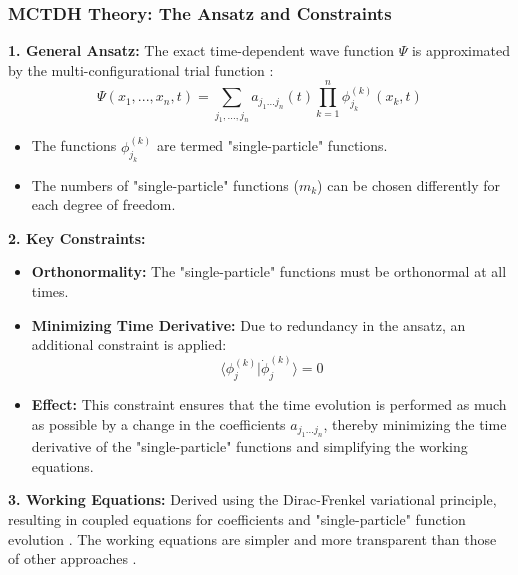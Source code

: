 \begin{frame}
    \frametitle{MCTDH Theory: The Ansatz and Constraints}
    
    \textbf{1. General Ansatz:}
    The exact time-dependent wave function $\Psi$ is approximated by the multi-configurational trial function :
    \begin{equation*}
        \Psi(x_1,...,x_n, t)= \sum_{j_1,...,j_n} a_{j_1...j_n} (t) \prod_{k=1}^n \phi_{j_k}^{(k)}(x_k, t)
    \end{equation*}
    \begin{itemize}
        \item The functions $\phi_{j_k}^{(k)}$ are termed "single-particle" functions.
        \item The numbers of "single-particle" functions ($m_k$) can be chosen differently for each degree of freedom.
    \end{itemize}
    
\end{frame}
\begin{frame}
    \textbf{2. Key Constraints:}
    \begin{itemize}
        \item \textbf{Orthonormality:} The "single-particle" functions must be orthonormal at all times.
        \item \textbf{Minimizing Time Derivative:} Due to redundancy in the ansatz, an additional constraint is applied:
        $$\langle \phi_j^{(k)} | \dot{\phi}_j^{(k)} \rangle = 0$$
        \item \textbf{Effect:} This constraint ensures that the time evolution is performed as much as possible by a change in the coefficients $a_{j_1...j_n}$, thereby minimizing the time derivative of the "single-particle" functions and simplifying the working equations.
    \end{itemize}
    
    \textbf{3. Working Equations:}
    Derived using the Dirac-Frenkel variational principle, resulting in coupled equations for coefficients  and "single-particle" function evolution . The working equations are simpler and more transparent than those of other approaches .
\end{frame}

